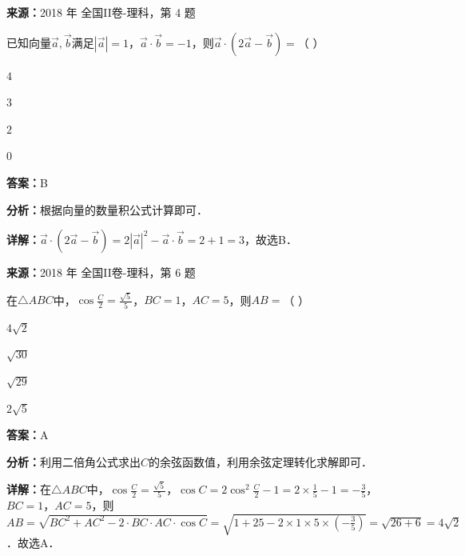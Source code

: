 \begin{question}[points=5]
\textbf{来源：}2018 年 全国II卷-理科，第 4 题\par
已知向量$\vec{a},\vec{b}$满足$|\vec{a}|=1$，$\vec{a}\cdot\vec{b}=-1$，则$\vec{a}\cdot(2\vec{a}-\vec{b})=$（     ）
\begin{choices}
  \item $4$
  \item $3$
  \item $2$
  \item $0$
\end{choices}
\begin{solution}
\textbf{答案：}B

\textbf{分析：}根据向量的数量积公式计算即可．

\textbf{详解：}$\vec{a}\cdot(2\vec{a}-\vec{b})=2|\vec{a}|^2-\vec{a}\cdot\vec{b}=2+1=3$，故选B．
\end{solution}
\end{question}

\begin{question}[points=5]
\textbf{来源：}2018 年 全国II卷-理科，第 6 题\par
在$\triangle ABC$中，$\cos\frac{C}{2}=\frac{\sqrt{5}}{5}$，$BC=1$，$AC=5$，则$AB=$（    ）
\begin{choices}
  \item $4\sqrt{2}$
  \item $\sqrt{30}$
  \item $\sqrt{29}$
  \item $2\sqrt{5}$
\end{choices}
\begin{solution}
\textbf{答案：}A

\textbf{分析：}利用二倍角公式求出$C$的余弦函数值，利用余弦定理转化求解即可．

\textbf{详解：}在$\triangle ABC$中，$\cos\frac{C}{2}=\frac{\sqrt{5}}{5}$，$\cos C=2\cos^2\frac{C}{2}-1=2\times\frac{1}{5}-1=-\frac{3}{5}$，$BC=1$，$AC=5$，则$AB=\sqrt{BC^2+AC^2-2\cdot BC\cdot AC\cdot\cos C}=\sqrt{1+25-2\times1\times5\times(-\frac{3}{5})}=\sqrt{26+6}=4\sqrt{2}$．故选A．
\end{solution}
\end{question}

